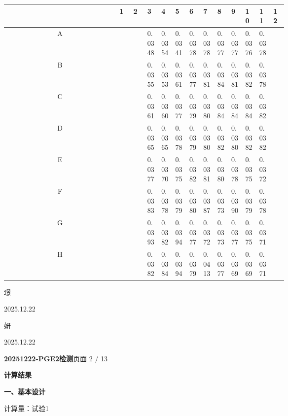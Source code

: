 \documentclass[UTF8,10pt,a4paper,fontset=fandol]{ctexart}
\newcommand{\handwritten}[1]{#1}
\begin{document}
\begin{center}
\scriptsize
\begin{tabular}{c|*{12}{p{0.055\linewidth}|}}
 & 1 & 2 & 3 & 4 & 5 & 6 & 7 & 8 & 9 & 10 & 11 & 12\\ \hline
A & & & 0.0348 & 0.0354 & 0.0341 & 0.0378 & 0.0378 & 0.0377 & 0.0377 & 0.0376 & 0.0378 & \\ \hline
B & & & 0.0355 & 0.0353 & 0.0361 & 0.0377 & 0.0381 & 0.0384 & 0.0381 & 0.0382 & 0.0378 & \\ \hline
C & & & 0.0361 & 0.0360 & 0.0377 & 0.0379 & 0.0380 & 0.0384 & 0.0384 & 0.0384 & 0.0382 & \\ \hline
D & & & 0.0365 & 0.0365 & 0.0378 & 0.0379 & 0.0380 & 0.0382 & 0.0380 & 0.0382 & 0.0382 & \\ \hline
E & & & 0.0377 & 0.0370 & 0.0375 & 0.0382 & 0.0381 & 0.0380 & 0.0378 & 0.0375 & 0.0372 & \\ \hline
F & & & 0.0383 & 0.0378 & 0.0379 & 0.0380 & 0.0387 & 0.0373 & 0.0390 & 0.0379 & 0.0378 & \\ \hline
G & & & 0.0393 & 0.0382 & 0.0394 & 0.0377 & 0.0372 & 0.0373 & 0.0377 & 0.0375 & 0.0371 & \\ \hline
H & & & 0.0382 & 0.0384 & 0.0394 & 0.0379 & 0.0413 & 0.0377 & 0.0369 & 0.0369 & 0.0371 & \\ \hline
\end{tabular}
\end{center}


\handwritten{璟}

\handwritten{2025.12.22}

\handwritten{妍}

\handwritten{2025.12.22}

\newpage

\noindent\textbf{20251222-PGE2检测}\hfill 页面 2 / 13

\medskip
\noindent\textbf{计算结果}

\noindent\textbf{一、基本设计}

\noindent
计算量：试验1
\end{document}
